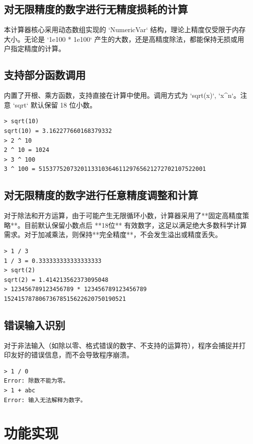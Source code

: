 \documentclass[UTF8]{ctexart}
\begin{document}
\subsection{对无限精度的数字进行无精度损耗的计算}
本计算器核心采用动态数组实现的 `NumericVar` 结构，理论上精度仅受限于内存大小。无论是 `1e100 * 1e100` 产生的大数，还是高精度除法，都能保持无损或用户指定精度的计算。

\subsection{支持部分函数调用}
内置了开根、乘方函数，支持直接在计算中使用。调用方式为 `sqrt(x)`, `x^n`。注意 `sqrt` 默认保留 18 位小数。
\begin{tcolorbox}[colback=gray!10, colframe=gray!50, arc=5pt]
\begin{verbatim}
> sqrt(10)
sqrt(10) = 3.162277660168379332
> 2 ^ 10
2 ^ 10 = 1024
> 3 ^ 100 
3 ^ 100 = 515377520732011331036461129765621272702107522001
\end{verbatim}
\end{tcolorbox}

\subsection{对无限精度的数字进行任意精度调整和计算}
对于除法和开方运算，由于可能产生无限循环小数，计算器采用了**固定高精度策略**。目前默认保留小数点后 **18位** 有效数字，这足以满足绝大多数科学计算需求。对于加减乘法，则保持**完全精度**，不会发生溢出或精度丢失。
\begin{tcolorbox}[colback=gray!10, colframe=gray!50, arc=5pt]
\begin{verbatim}
> 1 / 3
1 / 3 = 0.333333333333333333
> sqrt(2)
sqrt(2) = 1.414213562373095048
> 123456789123456789 * 123456789123456789
15241578780673678515622620750190521
\end{verbatim}
\end{tcolorbox}

\subsection{错误输入识别}
对于非法输入（如除以零、格式错误的数字、不支持的运算符），程序会捕捉并打印友好的错误信息，而不会导致程序崩溃。
\begin{verbatim}
> 1 / 0
Error: 除数不能为零。
> 1 + abc
Error: 输入无法解释为数字。
\end{verbatim}

\section{功能实现}
\end{document}

